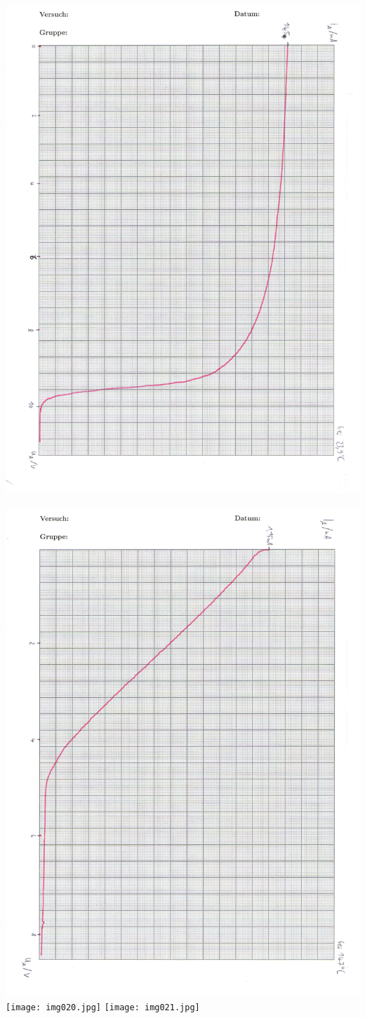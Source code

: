 \includegraphics[scale=0.75]{img018.jpg}\\\\
\includegraphics[scale=0.75]{img019.jpg}
\texttt{[image: img020.jpg]}
\texttt{[image: img021.jpg]}
